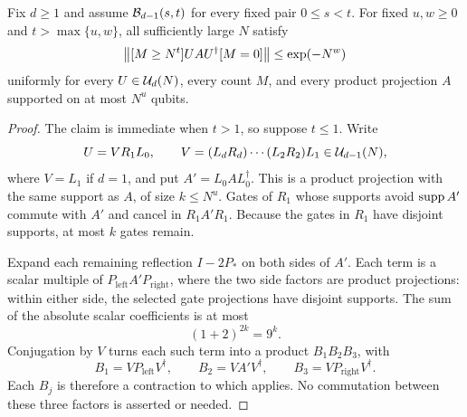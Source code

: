 \begin{lemma}\label{lem:small-support}
Fix $d\ge1$ and assume $\mathcal B_{d-1}(s,t)$ for every fixed pair
$0\le s<t$. For fixed $u,w\ge0$ and $t>\max\{u,w\}$,
all sufficiently large $N$ satisfy
\begin{equation}\label{eq:small-support}
 \left\lVert [M\ge N^t]UAU^\dagger[M=0]\right\rVert
 \le\exp(-N^w)
\end{equation}
uniformly for every $U\in\mathcal U_d(N)$, every count $M$, and
every product projection $A$ supported on at most $N^u$ qubits.
\end{lemma}

\begin{proof}
The claim is immediate when $t>1$, so suppose $t\le1$.
Write
\[
 U=VR_1L_0,\qquad
 V=(L_dR_d)\cdots(L_2R_2)L_1\in\mathcal U_{d-1}(N),
\]
where $V=L_1$ if $d=1$, and put $A'=L_0AL_0^\dagger$.
This is a product projection with the same support as $A$,
of size $k\le N^u$. Gates of $R_1$ whose supports avoid
$\operatorname{supp} A'$ commute with $A'$ and cancel in $R_1A'R_1$.
Because the gates in $R_1$ have disjoint supports, at most
$k$ gates remain.

Expand each remaining reflection $I-2P_*$ on both sides of
$A'$. Each term is a scalar multiple of
$P_{\mathrm{left}}A'P_{\mathrm{right}}$, where the two side
factors are product projections: within either side, the selected
gate projections have disjoint supports. The sum of the absolute
scalar coefficients is at most
\begin{equation}\label{eq:reflection-coefficients}
 (1+2)^{2k}=9^k.
\end{equation}
Conjugation by $V$ turns each such term into a product
$B_1B_2B_3$, with
\[
 B_1=VP_{\mathrm{left}}V^\dagger,\qquad
 B_2=VA'V^\dagger,\qquad
 B_3=VP_{\mathrm{right}}V^\dagger.
\]
Each $B_j$ is therefore a contraction
to which  applies. No commutation between
these three factors is asserted or needed.


\end{proof}
